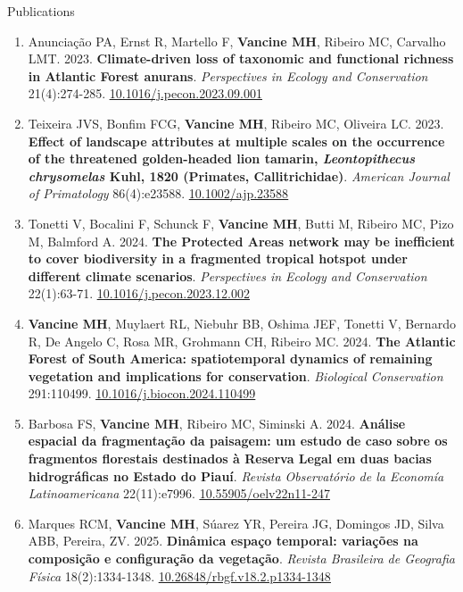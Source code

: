 \documentclass{resume}
\begin{document}
\begin{rSection}{Publications}
\begin{enumerate}
\item Anunciação PA, Ernst R, Martello F, {\bf Vancine MH}, Ribeiro MC, Carvalho LMT. 2023. {\bf Climate-driven loss of taxonomic and functional richness in Atlantic Forest anurans}. {\it Perspectives in Ecology and Conservation} 21(4):274-285. \href{https://doi.org/10.1016/j.pecon.2023.09.001}{\underline{10.1016/j.pecon.2023.09.001}}

\item Teixeira JVS, Bonfim FCG, {\bf Vancine MH}, Ribeiro MC, Oliveira LC. 2023. {\bf Effect of landscape attributes at multiple scales on the occurrence of the threatened golden-headed lion tamarin, \textbf{\textit{Leontopithecus chrysomelas}} Kuhl, 1820 (Primates, Callitrichidae)}. {\it American Journal of Primatology} 86(4):e23588. \href{https://doi.org/10.1002/ajp.23588}{\underline{10.1002/ajp.23588}}

\item Tonetti V, Bocalini F, Schunck F, {\bf Vancine MH}, Butti M, Ribeiro MC, Pizo M, Balmford A. 2024. {\bf The Protected Areas network may be inefficient to cover biodiversity in a fragmented tropical hotspot under different climate scenarios}. {\it Perspectives in Ecology and Conservation} 22(1):63-71. \href{https://doi.org/10.1016/j.pecon.2023.12.002}{\underline{10.1016/j.pecon.2023.12.002}}

\item {\bf Vancine MH}, Muylaert RL, Niebuhr BB, Oshima JEF, Tonetti V, Bernardo R, De Angelo C, Rosa MR, Grohmann CH, Ribeiro MC. 2024. {\bf The Atlantic Forest of South America: spatiotemporal dynamics of remaining vegetation and implications for conservation}. {\it Biological Conservation} 291:110499. \href{https://doi.org/10.1016/j.biocon.2024.110499}{\underline{10.1016/j.biocon.2024.110499}}

\item Barbosa FS, {\bf Vancine MH}, Ribeiro MC, Siminski A. 2024. {\bf Análise espacial da fragmentação da paisagem: um estudo de caso sobre os fragmentos florestais destinados à Reserva Legal em duas bacias hidrográficas no Estado do Piauí}. {\it Revista Observatório de la Economía Latinoamericana} 22(11):e7996. \href{https://doi.org/10.55905/oelv22n11-247}{\underline{10.55905/oelv22n11-247}}

\item Marques RCM, {\bf Vancine MH}, Súarez YR, Pereira JG, Domingos JD, Silva ABB, Pereira, ZV. 2025. {\bf Dinâmica espaço temporal: variações na composição e configuração da vegetação}. {\it Revista Brasileira de Geografia Física} 18(2):1334-1348. \href{https://doi.org/10.26848/rbgf.v18.2.p1334-1348}{\underline{10.26848/rbgf.v18.2.p1334-1348}}


\end{enumerate}
\end{rSection}
\end{document}
